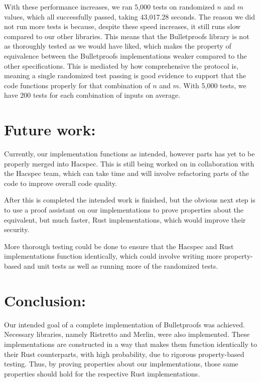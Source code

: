 \documentclass{article}
\begin{document}
\newpage

With these performance increases, we ran 5,000 tests on randomized
$n$ and $m$ values, which all successfully passed, taking 43,017.28
seconds. The reason we did not run more tests is because, despite
these speed increases, it still runs slow compared to our other
libraries. This means that the Bulletproofs library is not as thoroughly
tested as we would have liked, which makes the property of equivalence
between the Bulletproofs implementations weaker compared to the other
specifications. This is mediated by how comprehensive the protocol
is, meaning a single randomized test passing is good evidence to
support that the code functions properly for that combination of $n$
and $m$. With 5,000 tests, we have 200 tests for each combination of
inputs on average.

\section{Future work:} \label{future-work}

Currently, our implementation functions as intended, however parts has
yet to be properly merged into Hacspec. This is still being worked on in
collaboration with the Hacspec team, which can take time and will
involve refactoring parts of the code to improve overall code quality.

After this is completed the intended work is finished, but the obvious
next step is to use a proof assistant on our implementations to
prove properties about the equivalent, but much faster, Rust
implementations, which would improve their security.

More thorough testing could be done to ensure that the Hacspec and
Rust implementations function identically, which could involve writing
more property-based and unit tests as well as running more of the
randomized tests.

\section{Conclusion:} \label{conclusions}

Our intended goal of a complete implementation of Bulletproofs was
achieved. Necessary libraries, namely Ristretto and Merlin, were also
implemented. These implementations are constructed in a way that
makes them function identically to their Rust counterparts, with high
probability, due to rigorous property-based testing. Thus, by proving
properties about our implementations, those same properties should hold
for the respective Rust implementations.
\end{document}
